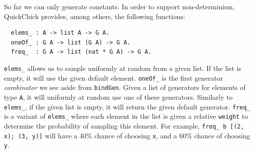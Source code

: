 \documentclass[twoside,11pt,openright]{report}
\newenvironment{code}{\captionsetup{type=figure, singlelinecheck=off, justification=raggedleft}}{}
\newcommand{\coq}[1]{\texttt{#1}}
\begin{document}
So far we can only generate constants. In order to support non-determinism, QuickChick provides, among others, the following functions:
\begin{code}
\label{def:elems-oneof-freq}
\begin{verbatim}
  elems_ : A -> list A -> G A.
  oneOf_ : G A -> list (G A) -> G A.
  freq_  : G A -> list (nat * G A) -> G A.
\end{verbatim}
\end{code}
\coq{elems\_} allows us to sample uniformly at random from a given list. If the list is empty, it will use the given default element. \coq{oneOf\_} is the first generator \textit{combinator} we see aside from \coq{bindGen}. Given a list of generators for elements of type \coq{A}, it will uniformly at random use one of these generators. Similarly to \coq{elems\_}, if the given list is empty, it will return the given default generator. \coq{freq\_} is a variant of \coq{elems\_} where each element in the list is given a relative \coq{weight} to determine the probability of sampling this element. For example, \coq{freq\_ b [(2, x); (3, y)]} will have a 40\% chance of choosing \coq{x}, and a 60\% chance of choosing \coq{y}. 
\end{document}
